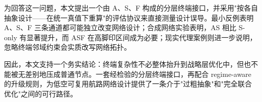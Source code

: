 \documentclass[review,authoryear]{elsarticle}
\begin{document}
为回答这一问题，本文提出一个由 A、S、F 构成的分层终端接口，并采用"按各自抽象设计——在统一真值下重算"的评估协议来直接测量设计误导。最小反例表明 A、S、F 三条通道都可能独立改变网络设计；合成网络实验表明，AS 相比 S-only 有显著提升，而 ASF 在高脚印区间成为必要；现实代理案例则进一步说明，忽略终端邻域约束会实质改写网络拓扑。

因此，本文支持一个务实结论：终端复杂性不必整体抬升到战略层优化中，但也不能被无差别地压成普通节点。一套经检验的分层终端接口，再配合 regime-aware 的升级规则，为低空可复用航路网络设计提供了一条介于"过粗抽象"和"完全联合优化"之间的可行路径。




\end{document}

